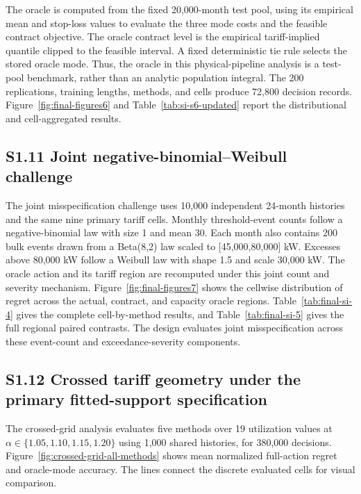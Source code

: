 \documentclass[]{interact}
\begin{document}
The oracle is computed from the fixed 20,000-month test pool, using its
empirical mean and stop-loss values to evaluate the three mode costs
and the feasible contract objective. The oracle contract level is the
empirical tariff-implied quantile clipped to the feasible interval.
A fixed deterministic tie rule selects the stored oracle mode. Thus,
the oracle in this physical-pipeline analysis is a test-pool benchmark,
rather than an analytic population integral. The 200 replications,
training lengths, methods, and cells produce 72,800 decision records.
Figure~\ref{fig:final-figures6} and
Table~\ref{tab:si-s6-updated} report the distributional and
cell-aggregated results.

\subsection*{S1.11 Joint negative-binomial--Weibull challenge}

The joint misspecification challenge uses 10,000 independent
24-month histories and the same nine primary tariff cells. Monthly
threshold-event counts follow a negative-binomial law with size 1 and
mean 30. Each month also contains 200 bulk events drawn from a
Beta(8,2) law scaled to [45,000,80,000] kW. Excesses above 80,000 kW
follow a Weibull law with shape 1.5 and scale 30,000 kW. The oracle
action and its tariff region are recomputed under this joint count
and severity mechanism. Figure~\ref{fig:final-figures7} shows the
cellwise distribution of regret across the actual, contract, and
capacity oracle regions. Table~\ref{tab:final-si-4} gives the complete
cell-by-method results, and Table~\ref{tab:final-si-5} gives the full
regional paired contrasts. The design evaluates joint misspecification across these event-count
and exceedance-severity components.


\subsection*{S1.12 Crossed tariff geometry under the primary fitted-support specification}

The crossed-grid analysis evaluates five methods over 19 utilization
values at $\alpha\in\{1.05,1.10,1.15,1.20\}$ using 1,000 shared
histories, for 380,000 decisions. Figure~\ref{fig:crossed-grid-all-methods}
shows mean normalized full-action regret and oracle-mode accuracy. The
lines connect the discrete evaluated cells for visual comparison.
\end{document}
